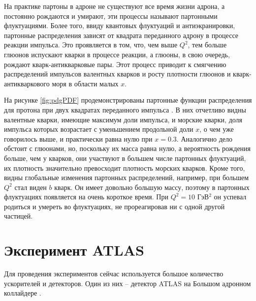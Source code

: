 \documentclass[12pt, a4paper]{article}
\begin{document}
На практике партоны в адроне не существуют все время жизни адрона, а постоянно рождаются и умирают, эти процессы называют партонными флуктуациями. 
Более того, ввиду квантовых флуктуаций и антиэкранировки, партонные распределения зависят от квадрата переданного адрону в процессе реакции импульса.
Это проявляется в том, что, чем выше $Q^2$, тем больше глюонов испускают кварки в процессе реакции, а глюоны, в свою очередь, рождают кварк-антикварковые пары. Этот процесс приводит к смягчению распределений импульсов валентных кварков и росту плотности глюонов и кварк-антикваркового моря в области малых $x$.

На рисунке \ref{fig:pdgPDF} продемонстрированы партонные функции распределения для протона при двух квадратах переданного импульса \cite{pdf_pdg}. В них отчетливо видны валентные кварки, имеющие максимум доли импульса, и морские кварки, доля импульса которых возрастает с уменьшением продольной доли $x$, о чем уже говорилось выше, и практически равна нулю при $x=0.3$. Аналогично дело обстоит с глюонами, но, поскольку их масса равна нулю, а вероятность рождения больше, чем у кварков, они участвуют в большем числе партонных флуктуаций, их плотность значительно превосходит плотность морских кварков. Кроме того, видны глобальные изменения партонных распределений, например, при большем $Q^2$ стал виден $b$ кварк. Он имеет довольно большую массу, поэтому в партонных флуктуациях появляется на очень короткое время. При $Q^2=10$ ГэВ$^2$ он успевал родиться и умереть во флуктуациях, не прореагировав ни с одной другой частицей.

\section{Эксперимент ATLAS}
Для проведения экспериментов сейчас используется большое количество ускорителей и детекторов. Один из них -- детектор ATLAS на Большом адронном коллайдере \cite{LHC}.

\end{document}
